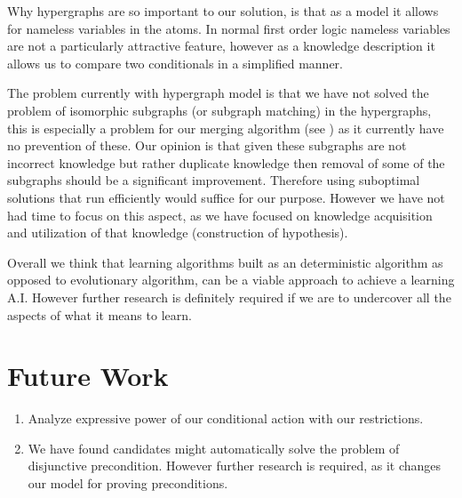 \documentclass[Master.tex]{subfiles}
\begin{document}
	Why hypergraphs are so important to our solution, is that as a model it allows for nameless variables in the atoms. 
	In normal first order logic nameless variables are not a particularly attractive feature, 
	however as a knowledge description it allows us to compare two conditionals in a simplified manner.
	
	The problem currently with hypergraph model is that we have not solved the problem of isomorphic subgraphs (or subgraph matching) in the hypergraphs, 
	this is especially a problem for our merging algorithm (see ) as it currently have no prevention of these.
	Our opinion is that given these subgraphs are not incorrect knowledge but rather duplicate knowledge then removal of some of the subgraphs should be a significant improvement.
	Therefore using suboptimal solutions that run efficiently would suffice for our purpose. 
	However we have not had time to focus on this aspect, as we have focused on knowledge acquisition and utilization of that knowledge (construction of hypothesis).
	
	
	Overall we think that learning algorithms built as an deterministic algorithm as opposed to evolutionary algorithm, can be a viable approach to achieve a learning A.I. However further research is definitely required if we are to undercover all the aspects of what it means to learn.
	
	
	
	
	
	

	\section{Future Work}
	
	\begin{enumerate}
		\item Analyze expressive power of our conditional action with our restrictions.
		\item We have found candidates might automatically solve the problem of disjunctive precondition. However further research is required, as it changes our model for proving preconditions.
	\end{enumerate}
	
\end{document}
